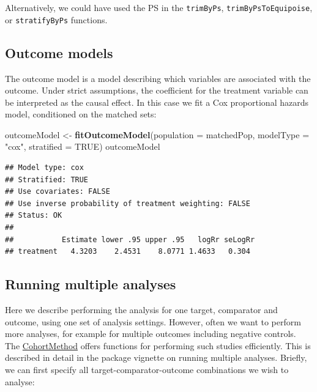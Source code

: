\documentclass[11pt]{book}
\newenvironment{Shaded}{\begin{snugshade}}{\end{snugshade}}
\newcommand{\KeywordTok}[1]{\textcolor[rgb]{0.13,0.29,0.53}{\textbf{#1}}}
\newcommand{\DataTypeTok}[1]{\textcolor[rgb]{0.13,0.29,0.53}{#1}}
\newcommand{\StringTok}[1]{\textcolor[rgb]{0.31,0.60,0.02}{#1}}
\newcommand{\OtherTok}[1]{\textcolor[rgb]{0.56,0.35,0.01}{#1}}
\newcommand{\NormalTok}[1]{#1}
\begin{document}
Alternatively, we could have used the PS in the \texttt{trimByPs},
\texttt{trimByPsToEquipoise}, or \texttt{stratifyByPs} functions.

\subsection{Outcome models}\label{outcome-models}

The outcome model is a model describing which variables are associated
with the outcome. Under strict assumptions, the coefficient for the
treatment variable can be interpreted as the causal effect. In this case
we fit a Cox proportional hazards model, conditioned on the matched
sets:

\begin{Shaded}
\begin{Highlighting}[]
\NormalTok{outcomeModel <-}\StringTok{ }\KeywordTok{fitOutcomeModel}\NormalTok{(}\DataTypeTok{population =}\NormalTok{ matchedPop,}
                                \DataTypeTok{modelType =} \StringTok{"cox"}\NormalTok{,}
                                \DataTypeTok{stratified =} \OtherTok{TRUE}\NormalTok{)}
\NormalTok{outcomeModel}
\end{Highlighting}
\end{Shaded}

\begin{verbatim}
## Model type: cox
## Stratified: TRUE
## Use covariates: FALSE
## Use inverse probability of treatment weighting: FALSE
## Status: OK
## 
##           Estimate lower .95 upper .95   logRr seLogRr
## treatment   4.3203    2.4531    8.0771 1.4633   0.304
\end{verbatim}

\subsection{Running multiple analyses}\label{running-multiple-analyses}

Here we describe performing the analysis for one target, comparator and
outcome, using one set of analysis settings. However, often we want to
perform more analyses, for example for multiple outcomes including
negative controls. The
\href{https://ohdsi.github.io/CohortMethod/}{CohortMethod} offers
functions for performing such studies efficiently. This is described in
detail in the package vignette on running multiple analyses. Briefly, we
can first specify all target-comparator-outcome combinations we wish to
analyse:
\end{document}
